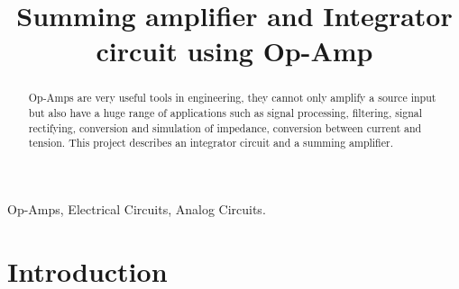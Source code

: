 \documentclass[journal]{IEEEtran}
\begin{document}
\title{Summing amplifier and Integrator circuit using Op-Amp}
%
%
%

	\author{
	        }

\maketitle


\begin{abstract}
    Op-Amps are very useful tools in engineering, they cannot only amplify a source input but also have a huge range of applications such as signal processing, filtering, signal rectifying, conversion and simulation of impedance, conversion between current and tension. This project describes an integrator circuit and a summing amplifier.
\end{abstract}
\begin{IEEEkeywords}
Op-Amps, Electrical Circuits, Analog Circuits.
\end{IEEEkeywords}

\section{Introduction}
\end{document}

